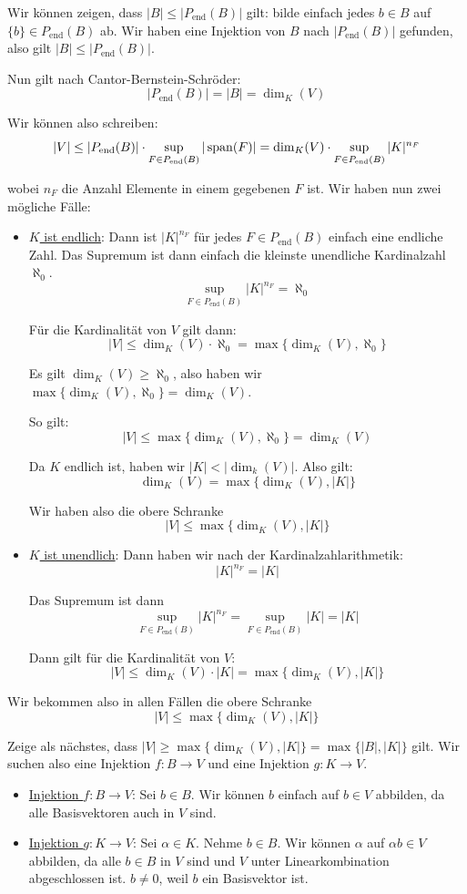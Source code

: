 \documentclass[12pt]{article}
\begin{document}
Wir können zeigen, dass $|B| \leq |P_\text{end}(B)|$ gilt: bilde einfach jedes $b \in B$ auf $\{b\} \in P_\text{end}(B)$ ab. Wir haben eine Injektion von $B$ nach $|P_\text{end}(B)|$ gefunden, also gilt $|B| \leq |P_\text{end}(B)|$.

Nun gilt nach Cantor-Bernstein-Schröder:
$$
    |P_\text{end}(B)| = |B| = \dim_K(V)
$$

Wir können also schreiben:
$$
    |V| \leq |P_\text{end}(B)| \cdot \sup_{F \in P_\text{end}(B)} |\operatorname{span}(F)| = \dim_K(V) \cdot \sup_{F \in P_\text{end}(B)} |K|^{n_F}
$$

wobei $n_F$ die Anzahl Elemente in einem gegebenen $F$ ist. Wir haben nun zwei mögliche Fälle:
\begin{itemize}
    \item \underline{$K$ ist endlich}: Dann ist $|K|^{n_F}$ für jedes $F \in P_\text{end}(B)$ einfach eine endliche Zahl. Das Supremum ist dann einfach die kleinste unendliche Kardinalzahl $\aleph_0$.
    $$
        \sup_{F \in P_\text{end}(B)} |K|^{n_F} = \aleph_0
    $$

    Für die Kardinalität von $V$ gilt dann:
    $$
        |V| \leq \dim_K(V) \cdot \aleph_0 = \max\{\dim_K(V),\aleph_0\}
    $$

    Es gilt $\dim_K(V) \geq \aleph_0$, also haben wir $\max\{\dim_K(V),\aleph_0\} = \dim_K(V)$.

    So gilt:
    $$
        |V| \leq \max\{\dim_K(V),\aleph_0\} = \dim_K(V)
    $$

    Da $K$ endlich ist, haben wir $|K| < |\dim_k(V)|$. Also gilt:
    $$
        \dim_K(V) = \max\{\dim_K(V), |K|\}
    $$

    Wir haben also die obere Schranke
    $$
        |V| \leq \max\{\dim_K(V), |K|\}
    $$

    \item \underline{$K$ ist unendlich}: Dann haben wir nach der Kardinalzahlarithmetik:
    $$
        |K|^{n_F} = |K|
    $$

    Das Supremum ist dann
    $$
        \sup_{F \in P_\text{end}(B)} |K|^{n_F} = \sup_{F \in P_\text{end}(B)} |K| = |K|
    $$

    Dann gilt für die Kardinalität von $V$:
    $$
        |V| \leq \dim_K(V) \cdot |K| = \max\{\dim_K(V), |K|\}
    $$
\end{itemize}

Wir bekommen also in allen Fällen die obere Schranke
$$
    |V| \leq \max\{\dim_K(V), |K|\}
$$

Zeige als nächstes, dass $|V| \geq \max\{\dim_K(V), |K|\} = \max\{|B|, |K|\}$ gilt. Wir suchen also eine Injektion $f: B \rightarrow V$ und eine Injektion $g: K \rightarrow V$.
\begin{itemize}
    \item \underline{Injektion $f: B \rightarrow V$}: Sei $b \in B$. Wir können $b$ einfach auf $b \in V$ abbilden, da alle Basisvektoren auch in $V$ sind.
    \item \underline{Injektion $g: K \rightarrow V$}: Sei $\alpha \in K$. Nehme $b \in B$. Wir können $\alpha$ auf $\alpha b \in V$ abbilden, da alle $b \in B$ in $V$ sind und $V$ unter Linearkombination abgeschlossen ist. $b \neq 0$, weil $b$ ein Basisvektor ist.
\end{itemize}
\end{document}
